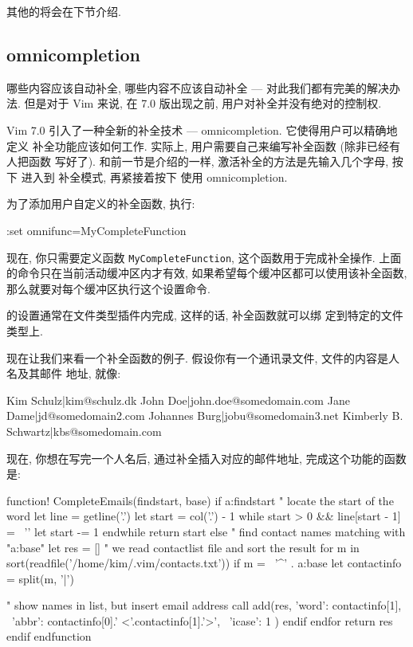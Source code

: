 其他的将会在下节介绍.

\subsection{omnicompletion}
\label{subsec:omnicompletion}

哪些内容应该自动补全, 哪些内容不应该自动补全 --- 对此我们都有完美的解决办法.
但是对于 Vim 来说, 在 7.0 版出现之前, 用户对补全并没有绝对的控制权.

Vim 7.0 引入了一种全新的补全技术 --- omnicompletion. 它使得用户可以精确地定义
补全功能应该如何工作. 实际上, 用户需要自己来编写补全函数 (除非已经有人把函数
写好了).
和前一节是介绍的一样, 激活补全的方法是先输入几个字母, 按下  进入到
补全模式, 再紧接着按下  使用 omnicompletion.

为了添加用户自定义的补全函数, 执行:
\begin{vimcode}
:set omnifunc=MyCompleteFunction
\end{vimcode}
现在, 你只需要定义函数 \texttt{MyCompleteFunction}, 这个函数用于完成补全操作.
上面的命令只在当前活动缓冲区内才有效, 如果希望每个缓冲区都可以使用该补全函数,
那么就要对每个缓冲区执行这个设置命令.
\begin{warning}
     的设置通常在文件类型插件内完成, 这样的话, 补全函数就可以绑
    定到特定的文件类型上.
\end{warning}

现在让我们来看一个补全函数的例子. 假设你有一个通讯录文件, 文件的内容是人名及其邮件
地址, 就像:
\begin{vimcode}
Kim Schulz|kim@schulz.dk
John Doe|john.doe@somedomain.com
Jane Dame|jd@somedomain2.com
Johannes Burg|jobu@somedomain3.net
Kimberly B. Schwartz|kbs@somedomain.com
\end{vimcode}

现在, 你想在写完一个人名后, 通过补全插入对应的邮件地址, 完成这个功能的函数是:
\begin{vimcode}
function! CompleteEmails(findstart, base)
	  if a:findstart
	    " locate the start of the word
	    let line = getline('.')
	    let start = col('.') - 1
	    while start > 0 && line[start - 1] =~ '\a'
	      let start -= 1
	    endwhile
	    return start
	  else
	    " find contact names matching with "a:base"
	    let res = []
		 " we read contactlist file and sort the result
	    for m in sort(readfile('/home/kim/.vim/contacts.txt'))
	      if m =~ '^' . a:base
				let contactinfo = split(m, '|')
\end{vimcode}
\begin{vimcode}
		      " show names in list, but insert email address 
		      call add(res, {'word': contactinfo[1], 
                     \ 'abbr': contactinfo[0].' <'.contactinfo[1].'>',
                 \ 'icase': 1} )
	      endif
	    endfor
	    return res
	  endif
	endfunction
\end{vimcode}

